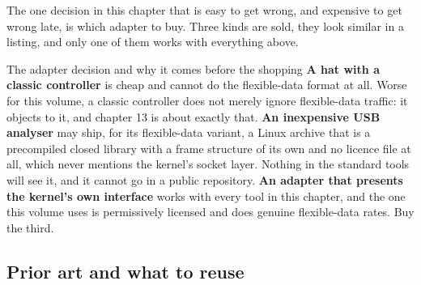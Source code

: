 The one decision in this chapter that is easy to get wrong, and expensive to get
wrong late, is which adapter to buy. Three kinds are sold, they look similar in
a listing, and only one of them works with everything above.

\begin{note}{The adapter decision and why it comes before the shopping}
\textbf{A hat with a classic controller} is cheap and cannot do the
flexible-data format at all. Worse for this volume, a classic controller does
not merely ignore flexible-data traffic: it objects to it, and chapter 13 is
about exactly that. \textbf{An inexpensive USB analyser} may ship, for its
flexible-data variant, a Linux archive that is a precompiled closed library with
a frame structure of its own and no licence file at all, which never mentions
the kernel's socket layer. Nothing in the standard tools will see it, and it
cannot go in a public repository. \textbf{An adapter that presents the kernel's
own interface} works with every tool in this chapter, and the one this volume
uses is permissively licensed and does genuine flexible-data rates. Buy the
third.
\end{note}

\subsection*{Prior art and what to reuse}

